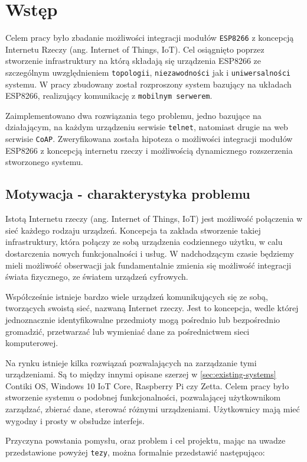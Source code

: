 \section{Wstęp}
\label{sec:wstep}
Celem pracy było zbadanie możliwości integracji modułów \texttt{ESP8266} z koncepcją  Internetu Rzeczy (ang. Internet of Things, IoT). Cel osiągnięto poprzez stworzenie infrastruktury na którą składają się urządzenia ESP8266 ze szczególnym uwzględnieniem \texttt{topologii}, \texttt{niezawodności} jak i \texttt{uniwersalności} systemu. W pracy zbudowany został rozproszony system bazujący na układach ESP8266, realizujący komunikację z \texttt{mobilnym serwerem}.

Zaimplementowano dwa rozwiązania tego problemu, jedno bazujące na działającym, na każdym urządzeniu serwisie \texttt{telnet}, natomiast drugie na web serwisie \texttt{CoAP}. Zweryfikowana została hipoteza o możliwości integracji modułów ESP8266 z koncepcją internetu rzeczy i możliwością dynamicznego rozszerzenia stworzonego systemu.

\subsection{Motywacja - charakterystyka problemu}
Istotą Internetu rzeczy (ang. Internet of Things, IoT) jest możliwość połączenia w sieć każdego rodzaju urządzeń. Koncepcja ta zakłada stworzenie takiej infrastruktury, która połączy ze sobą urządzenia codziennego użytku, w calu dostarczenia nowych funkcjonalności i usług. W nadchodzącym czasie będziemy mieli możliwość obserwacji jak fundamentalnie zmienia się możliwość integracji świata fizycznego, ze światem urządzeń cyfrowych. 

Współcześnie istnieje bardzo wiele urządzeń komunikujących się ze sobą, tworzących swoistą sieć, nazwaną Internet rzeczy\cite{iot-art}. Jest to koncepcja, wedle której jednoznacznie identyfikowalne przedmioty mogą pośrednio lub bezpośrednio gromadzić, przetwarzać lub wymieniać dane za pośrednictwem sieci komputerowej. 

Na rynku istnieje kilka rozwiązań pozwalających na zarządzanie tymi urządzeniami. Są to między innymi opisane szerzej w \autoref{sec:existing-systems} Contiki OS, Windows 10 IoT Core, Raspberry Pi czy Zetta. Celem pracy było stworzenie systemu o podobnej funkcjonalności, pozwalającej użytkownikom zarządzać, zbierać dane, sterować różnymi urządzeniami. Użytkownicy mają mieć wygodny i prosty w obsłudze interfejs. 

Przyczyna powstania pomysłu, oraz problem i cel projektu, mając na uwadze przedstawione powyżej \texttt{tezy}, można formalnie przedstawić następująco:


